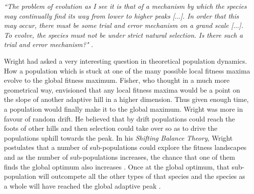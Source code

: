 \documentclass[oneside,11pt,a4paper]{book}
\begin{document}
\label{sec:fitval}

\textit{``The problem of evolution as I see it is that of a mechanism by which the species may continually find its way from lower to higher peaks [$\ldots$].
In order that this may occur, there must be some trial and error mechanism on a grand scale [$\ldots$].
To evolve, the species must not be under strict natural selection.
Is there such a trial and error mechanism?"}
\citep{wright:1932aa}.

Wright had asked a very interesting question in theoretical population dynamics.
How a population which is stuck at one of the many possible local fitness maxima evolve to the global fitness maximum.
Fisher, who thought in a much more geometrical way, envisioned that any local fitness maxima would be a point on the slope of another adaptive hill in a higher dimension.
Thus given enough time, a population would finally make it to the global maximum.
Wright was more in favour of random drift.
He believed that by drift populations could reach the foots of other hills and then selection could take over so as to drive the populations uphill towards the peak.
In his \textit{Shifting Balance Theory}, Wright postulates that a number of sub-populations could explore the fitness landscapes and as the number of sub-populations increases, the chance that one of them finds the global optimum also increases \citep{wright:1932aa}.
Once at the global optimum, that sub-population will outcompete all the other types of that species and the species as a whole will have reached the global adaptive peak \citep{ridley:1996bo}.
\end{document}
